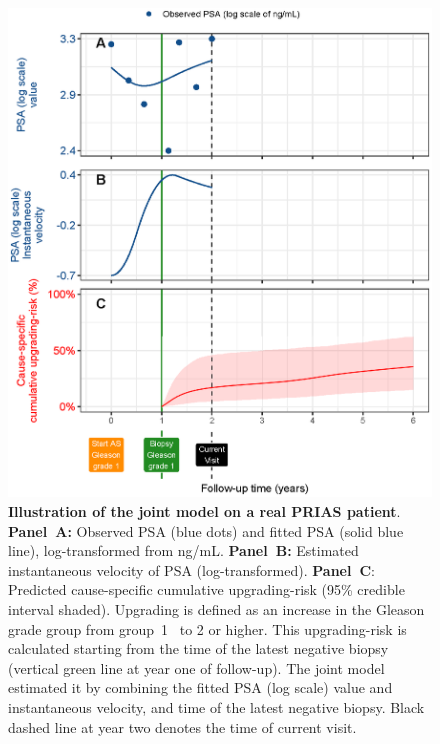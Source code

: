 \begin{figure}
\centerline{\includegraphics[width=\columnwidth]{images/jmExplanationPlot_113.eps}}
\caption{\textbf{Illustration of the joint model on a real PRIAS patient}. \textbf{Panel~A:} Observed PSA (blue dots) and fitted PSA (solid blue line), log-transformed from ng/mL. \textbf{Panel~B:} Estimated instantaneous velocity of PSA (log-transformed). \textbf{Panel~C}: Predicted cause-specific cumulative upgrading-risk (95\% credible interval shaded). Upgrading is defined as an increase in the Gleason grade group from group~1~\citep{epsteinGG2014} to 2 or higher. This upgrading-risk is calculated starting from the time of the latest negative biopsy (vertical green line at year one of follow-up). The joint model estimated it by combining the fitted PSA (log scale) value and instantaneous velocity, and time of the latest negative biopsy. Black dashed line at year two denotes the time of current visit.}
\label{fig:jmExplanationPlot_113}
\end{figure}

